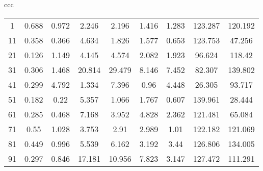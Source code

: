 \begin{table}[hbtp]
\begin{tabular}{ccc}
\begin{minipage}[t]{0.30\hsize}
\begin{tabular}{|c|c|c|c|c|c|c|c|c|}
          \hline
          1 & 0.688 & 0.972 & 2.246 & 2.196 & 1.416 & 1.283 & 123.287 & 120.192 \\
          11 & 0.358 & 0.366 & 4.634 & 1.826 & 1.577 & 0.653 & 123.753 & 47.256 \\
          21 & 0.126 & 1.149 & 4.145 & 4.574 & 2.082 & 1.923 & 96.624 & 118.42 \\
          31 & 0.306 & 1.468 & 20.814 & 29.479 & 8.146 & 7.452 & 82.307 & 139.802 \\
          41 & 0.299 & 4.792 & 1.334 & 7.396 & 0.96 & 4.448 & 26.305 & 93.717 \\
          51 & 0.182 & 0.22 & 5.357 & 1.066 & 1.767 & 0.607 & 139.961 & 28.444 \\
          61 & 0.285 & 0.468 & 7.168 & 3.952 & 4.828 & 2.362 & 121.481 & 65.084 \\
          71 & 0.55 & 1.028 & 3.753 & 2.91 & 2.989 & 1.01 & 122.182 & 121.069 \\
          81 & 0.449 & 0.996 & 5.539 & 6.162 & 3.192 & 3.44 & 126.806 & 134.005 \\
          91 & 0.297 & 0.846 & 17.181 & 10.956 & 7.823 & 3.147 & 127.472 & 111.291 \\
          \hline
        \end{tabular}
      \end{minipage}
      
    \end{tabular}
  \end{table}

